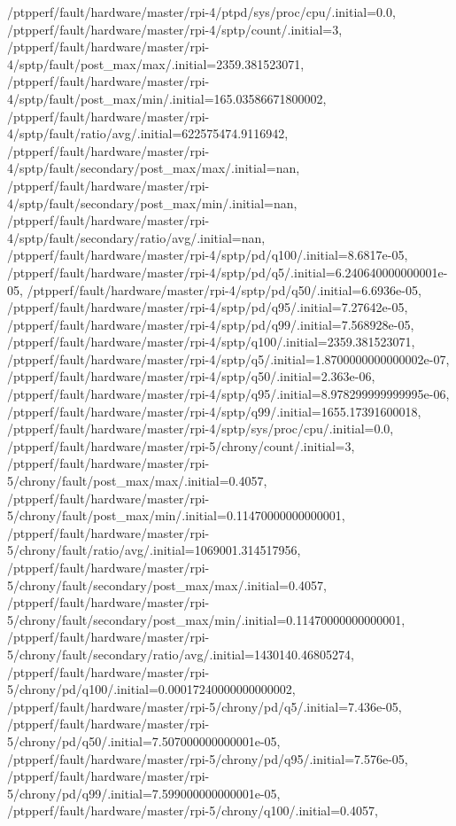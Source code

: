 {    /ptpperf/fault/hardware/master/rpi-4/ptpd/sys/proc/cpu/.initial=0.0,
    /ptpperf/fault/hardware/master/rpi-4/sptp/count/.initial=3,
    /ptpperf/fault/hardware/master/rpi-4/sptp/fault/post_max/max/.initial=2359.381523071,
    /ptpperf/fault/hardware/master/rpi-4/sptp/fault/post_max/min/.initial=165.03586671800002,
    /ptpperf/fault/hardware/master/rpi-4/sptp/fault/ratio/avg/.initial=622575474.9116942,
    /ptpperf/fault/hardware/master/rpi-4/sptp/fault/secondary/post_max/max/.initial=nan,
    /ptpperf/fault/hardware/master/rpi-4/sptp/fault/secondary/post_max/min/.initial=nan,
    /ptpperf/fault/hardware/master/rpi-4/sptp/fault/secondary/ratio/avg/.initial=nan,
    /ptpperf/fault/hardware/master/rpi-4/sptp/pd/q100/.initial=8.6817e-05,
    /ptpperf/fault/hardware/master/rpi-4/sptp/pd/q5/.initial=6.240640000000001e-05,
    /ptpperf/fault/hardware/master/rpi-4/sptp/pd/q50/.initial=6.6936e-05,
    /ptpperf/fault/hardware/master/rpi-4/sptp/pd/q95/.initial=7.27642e-05,
    /ptpperf/fault/hardware/master/rpi-4/sptp/pd/q99/.initial=7.568928e-05,
    /ptpperf/fault/hardware/master/rpi-4/sptp/q100/.initial=2359.381523071,
    /ptpperf/fault/hardware/master/rpi-4/sptp/q5/.initial=1.8700000000000002e-07,
    /ptpperf/fault/hardware/master/rpi-4/sptp/q50/.initial=2.363e-06,
    /ptpperf/fault/hardware/master/rpi-4/sptp/q95/.initial=8.978299999999995e-06,
    /ptpperf/fault/hardware/master/rpi-4/sptp/q99/.initial=1655.17391600018,
    /ptpperf/fault/hardware/master/rpi-4/sptp/sys/proc/cpu/.initial=0.0,
    /ptpperf/fault/hardware/master/rpi-5/chrony/count/.initial=3,
    /ptpperf/fault/hardware/master/rpi-5/chrony/fault/post_max/max/.initial=0.4057,
    /ptpperf/fault/hardware/master/rpi-5/chrony/fault/post_max/min/.initial=0.11470000000000001,
    /ptpperf/fault/hardware/master/rpi-5/chrony/fault/ratio/avg/.initial=1069001.314517956,
    /ptpperf/fault/hardware/master/rpi-5/chrony/fault/secondary/post_max/max/.initial=0.4057,
    /ptpperf/fault/hardware/master/rpi-5/chrony/fault/secondary/post_max/min/.initial=0.11470000000000001,
    /ptpperf/fault/hardware/master/rpi-5/chrony/fault/secondary/ratio/avg/.initial=1430140.46805274,
    /ptpperf/fault/hardware/master/rpi-5/chrony/pd/q100/.initial=0.00017240000000000002,
    /ptpperf/fault/hardware/master/rpi-5/chrony/pd/q5/.initial=7.436e-05,
    /ptpperf/fault/hardware/master/rpi-5/chrony/pd/q50/.initial=7.507000000000001e-05,
    /ptpperf/fault/hardware/master/rpi-5/chrony/pd/q95/.initial=7.576e-05,
    /ptpperf/fault/hardware/master/rpi-5/chrony/pd/q99/.initial=7.599000000000001e-05,
    /ptpperf/fault/hardware/master/rpi-5/chrony/q100/.initial=0.4057,
}
